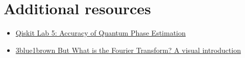\documentclass{book}
\begin{document}
\section{Additional resources}
\begin{itemize}
    \item \href{https://learn.qiskit.org/course/ch-labs/lab-5-accuracy-of-quantum-phase-estimation}{Qiskit Lab 5: Accuracy of Quantum Phase Estimation}

    \item \href{https://www.3blue1brown.com/lessons/fourier-transforms}{3blue1brown But What is the Fourier Transform? A visual introduction}
\end{itemize}












\end{document}
